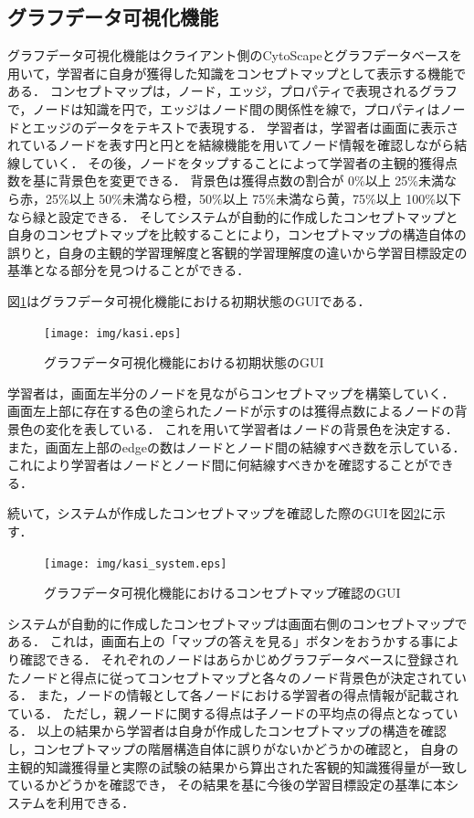 \subsection{グラフデータ可視化機能}\label{subsec:kasi}
グラフデータ可視化機能はクライアント側のCytoScapeとグラフデータベースを用いて，学習者に自身が獲得した知識をコンセプトマップとして表示する機能である．
コンセプトマップは，ノード，エッジ，プロパティで表現されるグラフで，ノードは知識を円で，エッジはノード間の関係性を線で，プロパティはノードとエッジのデータをテキストで表現する．
学習者は，学習者は画面に表示されているノードを表す円と円とを結線機能を用いてノード情報を確認しながら結線していく．
その後，ノードをタップすることによって学習者の主観的獲得点数を基に背景色を変更できる．
背景色は獲得点数の割合が 0\%以上 25\%未満なら赤，25\%以上 50\%未満なら橙，50\%以上 75\%未満なら黄，75\%以上 100\%以下なら緑と設定できる．
そしてシステムが自動的に作成したコンセプトマップと自身のコンセプトマップを比較することにより，コンセプトマップの構造自体の誤りと，自身の主観的学習理解度と客観的学習理解度の違いから学習目標設定の基準となる部分を見つけることができる．

図\ref{fig:kasi}はグラフデータ可視化機能における初期状態のGUIである．


\begin{figure}[htbp]
\begin{center}
\texttt{[image: img/kasi.eps]}
\end{center}
\caption{グラフデータ可視化機能における初期状態のGUI}
\label{fig:kasi}
\end{figure}

学習者は，画面左半分のノードを見ながらコンセプトマップを構築していく．
画面左上部に存在する色の塗られたノードが示すのは獲得点数によるノードの背景色の変化を表している．
これを用いて学習者はノードの背景色を決定する．
また，画面左上部のedgeの数はノードとノード間の結線すべき数を示している．
これにより学習者はノードとノード間に何結線すべきかを確認することができる．

続いて，システムが作成したコンセプトマップを確認した際のGUIを図\ref{fig:kasi_system}に示す．

\begin{figure}[htbp]
\begin{center}
\texttt{[image: img/kasi\_system.eps]}
\end{center}
\caption{グラフデータ可視化機能におけるコンセプトマップ確認のGUI}
\label{fig:kasi_system}
\end{figure}

システムが自動的に作成したコンセプトマップは画面右側のコンセプトマップである．
これは，画面右上の「マップの答えを見る」ボタンをおうかする事により確認できる．
それぞれのノードはあらかじめグラフデータベースに登録されたノードと得点に従ってコンセプトマップと各々のノード背景色が決定されている．
また，ノードの情報として各ノードにおける学習者の得点情報が記載されている．
ただし，親ノードに関する得点は子ノードの平均点の得点となっている．
以上の結果から学習者は自身が作成したコンセプトマップの構造を確認し，コンセプトマップの階層構造自体に誤りがないかどうかの確認と，
自身の主観的知識獲得量と実際の試験の結果から算出された客観的知識獲得量が一致しているかどうかを確認でき，
その結果を基に今後の学習目標設定の基準に本システムを利用できる．
\newpage